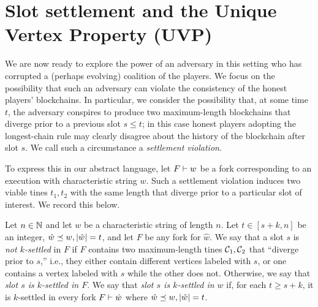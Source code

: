 \section[Slot Settlement and UVP]{Slot settlement and the Unique Vertex Property (UVP)}\label{sec:model-settlement}
  
  We are now ready to explore the power of an adversary in this
  setting who has corrupted a (perhaps evolving) coalition of the
  players. We focus on the possibility that such an adversary can
  violate the consistency of the honest players'
  blockchains. In particular, we consider the possibility that, at
  some time $t$, the adversary conspires to produce two maximum-length blockchains 
  that diverge prior to a previous slot $s \leq t$; in
  this case honest players adopting the longest-chain rule may clearly
  disagree about the history of the blockchain after slot $s$. We call
  such a circumstance a \emph{settlement violation}.

  To express this in our abstract language, let $F \vdash w$ be a fork
  corresponding to an execution with characteristic string $w$. Such a
  settlement violation induces two viable tines $t_1, t_2$ with the
  same length that diverge prior to a particular slot of interest. We
  record this below.
    
  \begin{definition}\label{def:settlement-mh}
    Let $n \in \mathbb{N}$ and let $w$ be a characteristic string of length $n$. 
    Let $t \in [s + k, n]$ be an integer, $\hat{w} \preceq w, |\hat{w}| = t$, and 
    let $F$ be any fork for $\hat{w}$. 
    We say that a slot $s$ is \emph{not $k$-settled} in $F$ if 
    $F$ contains two maximum-length tines $\mathcal{C}_1, \mathcal{C}_2$ 
    that ``diverge prior to $s$,'' i.e., they either
    contain different vertices labeled with $s$, or one contains a
    vertex labeled with $s$ while the other does not. 
    Otherwise, we say that \emph{slot $s$ is $k$-settled in $F$}. 
    We say that \emph{slot $s$ is $k$-settled in $w$} if, 
    for each $t \geq s+k$, 
    it is $k$-settled in every fork $F \vdash \hat{w}$ where $\hat{w} \preceq w, |\hat{w}| = t$.
  \end{definition}




